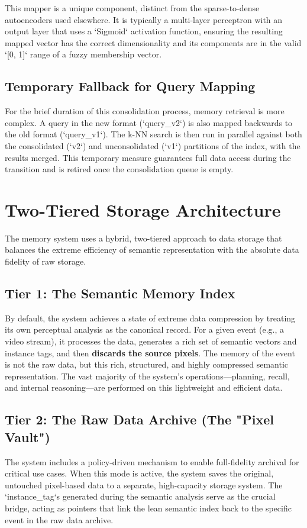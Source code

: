 \documentclass{article}
\begin{document}
This mapper is a unique component, distinct from the sparse-to-dense autoencoders used elsewhere. It is typically a multi-layer perceptron with an output layer that uses a `Sigmoid` activation function, ensuring the resulting mapped vector has the correct dimensionality and its components are in the valid `[0, 1]` range of a fuzzy membership vector.

\subsection{Temporary Fallback for Query Mapping}
For the brief duration of this consolidation process, memory retrieval is more complex. A query in the new format (`query_v2`) is also mapped backwards to the old format (`query_v1`). The k-NN search is then run in parallel against both the consolidated (`v2`) and unconsolidated (`v1`) partitions of the index, with the results merged. This temporary measure guarantees full data access during the transition and is retired once the consolidation queue is empty.

\section{Two-Tiered Storage Architecture}

The memory system uses a hybrid, two-tiered approach to data storage that balances the extreme efficiency of semantic representation with the absolute data fidelity of raw storage.

\subsection{Tier 1: The Semantic Memory Index}
By default, the system achieves a state of extreme data compression by treating its own perceptual analysis as the canonical record. For a given event (e.g., a video stream), it processes the data, generates a rich set of semantic vectors and instance tags, and then \textbf{discards the source pixels}. The memory of the event is not the raw data, but this rich, structured, and highly compressed semantic representation. The vast majority of the system's operations---planning, recall, and internal reasoning---are performed on this lightweight and efficient data.

\subsection{Tier 2: The Raw Data Archive (The "Pixel Vault")}
The system includes a policy-driven mechanism to enable full-fidelity archival for critical use cases. When this mode is active, the system saves the original, untouched pixel-based data to a separate, high-capacity storage system. The `instance_tag`s generated during the semantic analysis serve as the crucial bridge, acting as pointers that link the lean semantic index back to the specific event in the raw data archive.
\end{document}
